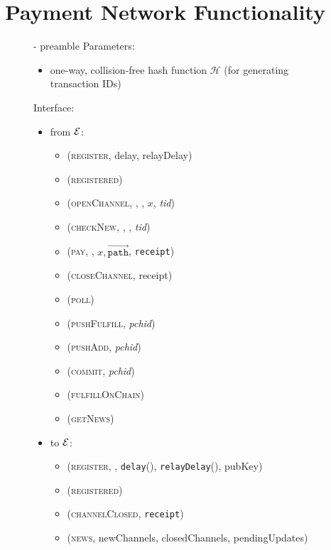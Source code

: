 \section{Payment Network Functionality}
  \begin{figure}[H]
    \begin{systembox}{\fpaynet - preamble}
      Parameters:
        \begin{itemize}
          \item one-way, collision-free hash function $\mathcal{H}$ (for
          generating transaction IDs)
        \end{itemize}

      Interface: 
      \begin{itemize}
        \item from $\mathcal{E}$:
        \begin{itemize}
          \item (\textsc{register}, delay, relayDelay)
          \item (\textsc{registered})
          \item (\textsc{openChannel}, \alice, \bob, $x$, \textit{tid})
          \item (\textsc{checkNew}, \alice, \bob, \textit{tid})
          \item (\textsc{pay}, \bob, $x, \overrightarrow{\mathtt{path}}$,
          \texttt{receipt})
          \item (\textsc{closeChannel}, receipt)
          \item (\textsc{poll})
          \item (\textsc{pushFulfill}, \textit{pchid})
          \item (\textsc{pushAdd}, \textit{pchid})
          \item (\textsc{commit}, \textit{pchid})
          \item (\textsc{fulfillOnChain})
          \item (\textsc{getNews})
        \end{itemize}
        \item to $\mathcal{E}$:
        \begin{itemize}
          \item (\textsc{register}, \alice, \texttt{delay}(\alice),
          \texttt{relayDelay}(\alice), pubKey)
          \item (\textsc{registered})
          \item (\textsc{channelClosed}, \texttt{receipt})
          \item (\textsc{news}, newChannels, closedChannels, pendingUpdates)

\end{itemize}
\end{itemize}
\end{systembox}
\end{figure}
